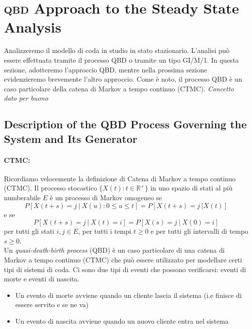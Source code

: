 \documentclass[11pt]{article}
\newcommand{\R}{\mathbb{R}}
\begin{document}
\section{\textsc{qbd} Approach to the Steady State Analysis}

Analizzeremo il modello di coda in studio in stato stazionario. L'analisi può essere effettuata tramite il processo QBD o tramite un tipo GI/M/1. In questa sezione, adotteremo l'approccio QBD, mentre nella prossima sezione evidenzieremo brevemente l'altro approccio. Come è noto, il processo QBD è un caso particolare della catena di Markov a tempo continuo (CTMC). \emph{Concetto dato per buono}

\subsection{Description of the QBD Process Governing the System and Its Generator}

\paragraph{CTMC:} Ricordiamo velocemente la definizione di Catena di Markov a tempo continuo (CTMC). Il processo stocastico $\{X(t) : t \in \R^+\}$ in uno spazio di stati al più numberabile $E$ è un processo di Markov omogeneo se
$$ P[X(t+s) = j ~ | ~ X(u) : 0 \leq u \leq t] =  P[X(t+s) = j ~ | X(t)]$$
e se
$$  P[X(t+s) = j ~ | ~ X(t) = i] =  P[X(s) = j ~ | ~ X(0) = i]$$
per tutti gli stati $i, j \in E$, per tutti i tempi $t \geq 0$ e per tutti gli intervalli di tempo $s \geq 0$. \\


Un \emph{quasi-death-birth process} (QBD) è un caso particolare di una catena di Markov a tempo continuo (CTMC) che può essere utilizzato per modellare certi tipi di sistemi di coda. Ci sono due tipi di eventi che possono verificarsi: eventi di morte e eventi di nascita.
\begin{itemize}
    \item Un evento di morte avviene quando un cliente lascia il sistema (i.e finisce di essere servito e se ne va)
    \item Un evento di nascita avviene quando un nuovo cliente entra nel sistema
\end{itemize}
\end{document}
